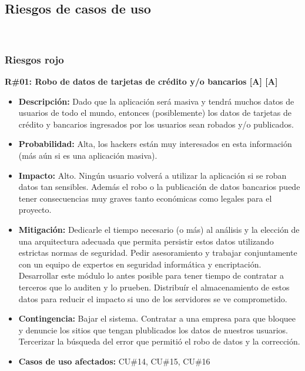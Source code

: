 \subsection{Riesgos de casos de uso}

~

\subsubsection{Riesgos rojo}

\noindent\textbf{R\#01: Robo de datos de tarjetas de crédito y/o bancarios [A] [A]} 
\begin{itemize}
	\item{\textbf{Descripción:} Dado que la aplicación será masiva y tendrá muchos datos de usuarios de todo el mundo, entonces (posiblemente) los datos de tarjetas de crédito y bancarios ingresados por los usuarios sean robados y/o publicados.}
	\item{\textbf{Probabilidad:} Alta, los hackers están muy interesados en esta información (más aún si es una aplicación masiva).}
	\item{\textbf{Impacto:} Alto. Ningún usuario volverá a utilizar la aplicación si se roban datos tan sensibles. Además el robo o la publicación de datos bancarios puede tener consecuencias muy graves tanto económicas como legales para el proyecto.}
	\item{\textbf{Mitigación:} Dedicarle el tiempo necesario (o más) al análisis y la elección de una arquitectura adecuada que permita persistir estos datos utilizando estrictas normas de seguridad. Pedir asesoramiento y trabajar conjuntamente con un equipo de expertos en seguridad informática y encriptación. Desarrollar este módulo lo antes posible para tener tiempo de contratar a terceros que lo auditen y lo prueben. Distribuír el almacenamiento de estos datos para reducir el impacto si uno de los servidores se ve comprometido.}
	\item{\textbf{Contingencia:} Bajar el sistema. Contratar a una empresa para que bloquee y denuncie los sitios que tengan plublicados los datos de nuestros usuarios. Tercerizar la búsqueda del error que permitió el robo de datos y la corrección.}
	\item{\textbf{Casos de uso afectados:} CU\#14, CU\#15, CU\#16}
\end{itemize}

~


